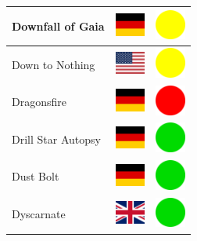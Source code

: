 \documentclass[12pt, a4paper, twoside]{report}
\begin{document}
\begin{center}
\begin{longtable}{|p{5cm}|p{2cm}|p{2cm}|}
Downfall of Gaia & \includegraphics[width=1cm]{4x3/de} & \includegraphics[width=1cm]{likes/m} \\ \hline
Down to Nothing & \includegraphics[width=1cm]{4x3/us} & \includegraphics[width=1cm]{likes/m} \\ \hline
Dragonsfire & \includegraphics[width=1cm]{4x3/de} & \includegraphics[width=1cm]{likes/n} \\ \hline
Drill Star Autopsy & \includegraphics[width=1cm]{4x3/de} & \includegraphics[width=1cm]{likes/y} \\ \hline
Dust Bolt & \includegraphics[width=1cm]{4x3/de} & \includegraphics[width=1cm]{likes/y} \\ \hline
Dyscarnate & \includegraphics[width=1cm]{4x3/gb} & \includegraphics[width=1cm]{likes/y} \\ \hline

\end{longtable}
\end{center}
\end{document}
